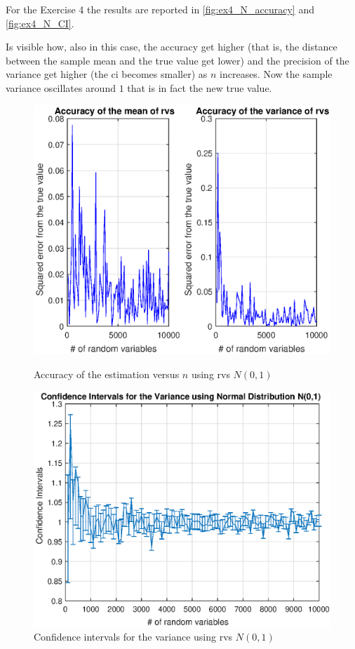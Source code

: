\documentclass[11pt,a4paper]{article}
\begin{document}
For the Exercise 4 the results are reported in \autoref{fig:ex4_N_accuracy} and \autoref{fig:ex4_N_CI}.

Is visible how, also in this case, the accuracy get higher (that is, the distance between the sample mean and the true value get lower)  and the precision of the variance get higher (the \gls{ci} becomes smaller) as $n$ increases. Now the sample variance oscillates around $1$ that is in fact the new true value.

\begin{figure}[ht]
	\centering
	\begin{minipage}{0.45\textwidth}
		\centering
		\includegraphics[width=\textwidth]{ex4_N_accuracy}
		\caption{Accuracy of the estimation versus $n$ using rvs $N(0,1)$}
		\label{fig:ex4_N_accuracy}
	\end{minipage}
	\begin{minipage}{0.45\textwidth}
		\centering
		\includegraphics[width=\textwidth]{ex4_N_CI}
		\caption{Confidence intervals for the variance using rvs $N(0,1)$}
		\label{fig:ex4_N_CI}
	\end{minipage}
\end{figure}
\end{document}
